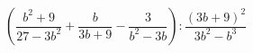 \begin{ex}[type=expression]
	\begin{condition}
		\( \left( \dfrac{b^2+9}{27-3b^2}+\dfrac{b}{3b+9}-\dfrac{3}{b^2-3b} \right):\dfrac{(3b+9)^2}{3b^2-b^3} \)
	\end{condition}
\end{ex}